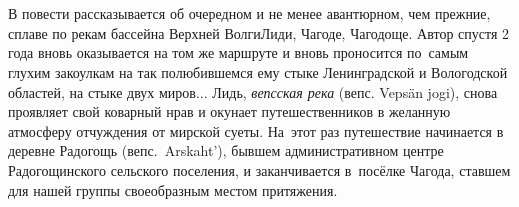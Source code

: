 \chapter*{}

В повести рассказывается об очередном и не менее авантюрном, чем прежние, сплаве по рекам бассейна Верхней Волги\mdash Лиди, Чагоде, Чагодоще. Автор спустя 2 года вновь оказывается на том же маршруте и вновь проносится по~самым глухим закоулкам на так полюбившемся ему стыке Ленинградской и Вологодской областей, на стыке двух миров$\ldots$ Лидь, \textit{вепсская река} (вепс. Veps{\"a}n jogi), снова проявляет свой коварный нрав и окунает путешественников в желанную атмосферу отчуждения от мирской суеты. На~этот раз путешествие начинается в деревне Радогощь (вепс.~Arskaht'), бывшем административном центре Радогощинского сельского поселения, и заканчивается в~посёлке Чагода, ставшем для нашей группы своеобразным местом притяжения. 
%

